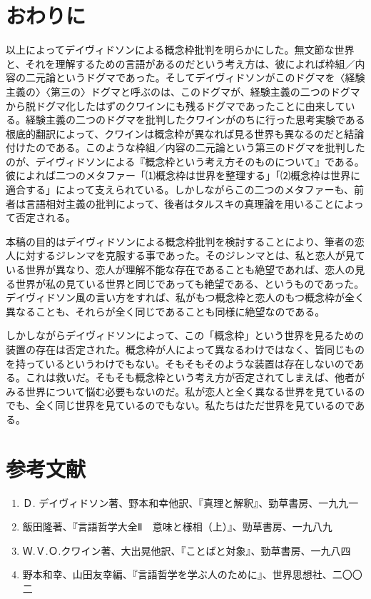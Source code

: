 \documentclass[b5j,twoside,twocolumn]{utarticle}
\begin{document}
\section{おわりに}
以上によってデイヴィドソンによる概念枠批判を明らかにした。無文節な世界と、それを理解するための言語があるのだという考え方は、彼によれば枠組／内容の二元論というドグマであった。そしてデイヴィドソンがこのドグマを〈経験主義の〉〈第三の〉ドグマと呼ぶのは、このドグマが、経験主義の二つのドグマから脱ドグマ化したはずのクワインにも残るドグマであったことに由来している。経験主義の二つのドグマを批判したクワインがのちに行った思考実験である根底的翻訳によって、クワインは概念枠が異なれば見る世界も異なるのだと結論付けたのである。このような枠組／内容の二元論という第三のドグマを批判したのが、デイヴィドソンによる『概念枠という考え方そのものについて』である。彼によれば二つのメタファー「⑴概念枠は世界を整理する」「⑵概念枠は世界に適合する」によって支えられている。しかしながらこの二つのメタファーも、前者は言語相対主義の批判によって、後者はタルスキの真理論を用いることによって否定される。


本稿の目的はデイヴィドソンによる概念枠批判を検討することにより、筆者の恋人に対するジレンマを克服する事であった。そのジレンマとは、私と恋人が見ている世界が異なり、恋人が理解不能な存在であることも絶望であれば、恋人の見る世界が私の見ている世界と同じであっても絶望である、というものであった。デイヴィドソン風の言い方をすれば、私がもつ概念枠と恋人のもつ概念枠が全く異なることも、それらが全く同じであることも同様に絶望なのである。


しかしながらデイヴィドソンによって、この「概念枠」という世界を見るための装置の存在は否定された。概念枠が人によって異なるわけではなく、皆同じものを持っているというわけでもない。そもそもそのような装置は存在しないのである。これは救いだ。そもそも概念枠という考え方が否定されてしまえば、他者がみる世界について悩む必要もないのだ。私が恋人と全く異なる世界を見ているのでも、全く同じ世界を見ているのでもない。私たちはただ世界を見ているのである。

{\small
\section*{参考文献}
\renewcommand{\labelenumi}{\pbox<y>{[\arabic{enumi}]}}
\begin{enumerate}
\item Ｄ. デイヴィドソン著、野本和幸他訳、『真理と解釈』、勁草書房、一九九一
\item 飯田隆著、『言語哲学大全Ⅱ　意味と様相（上）』、勁草書房、一九八九
\item  Ｗ.Ｖ.Ｏ.クワイン著、大出晃他訳、『ことばと対象』、勁草書房、一九八四
\item 野本和幸、山田友幸編、『言語哲学を学ぶ人のために』、世界思想社、二〇〇二
\end{enumerate}
}
\end{document}

